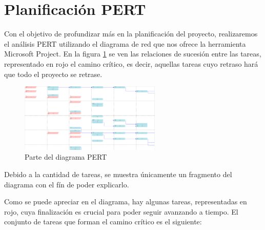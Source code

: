 \section{Planificación PERT}

\par Con el objetivo de profundizar más en la planificación del proyecto, realizaremos el análisis PERT utilizando el diagrama de red que nos ofrece la herramienta Microsoft Project. En la figura \ref{fig:pert} se ven las relaciones de sucesión entre las tareas, representado en rojo el camino crítico, es decir, aquellas tareas cuyo retraso hará que todo el proyecto se retrase.

\begin{figure}[h]
\begin{center}
\includegraphics[width=0.6\textwidth]{./img/Pert.png}
\end{center}
\caption{Parte del diagrama PERT}
\label{fig:pert}
\end{figure}

\par Debido a la cantidad de tareas, se muestra únicamente un fragmento del diagrama con el fín de poder explicarlo.

\par Como se puede apreciar en el diagrama, hay algunas tareas, representadas en rojo, cuya finalización es crucial para poder seguir avanzando a tiempo. El conjunto de tareas que forman el camino crítico es el siguiente:

